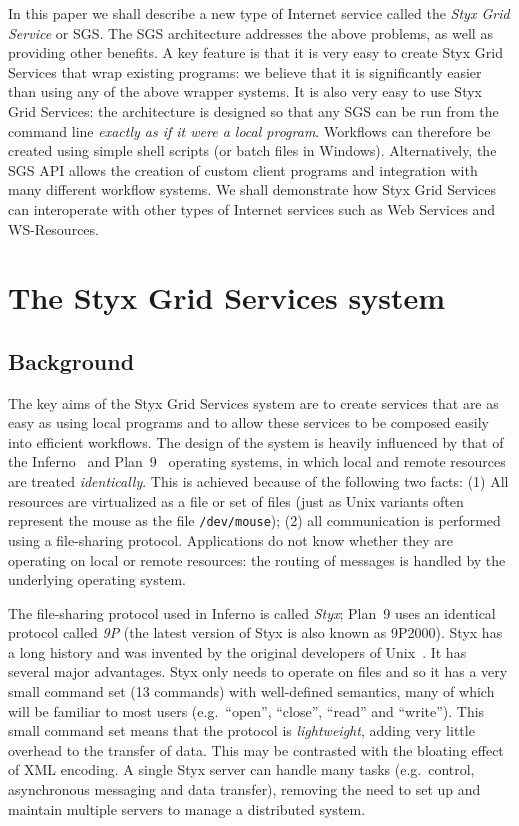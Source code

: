 \documentclass{llncs}
\begin{document}
In this paper we shall describe a new type of Internet service called the {\em Styx Grid Service\/} or SGS.  The SGS architecture addresses the above problems, as well as providing other benefits.  A key feature is that it is very easy to create Styx Grid Services that wrap existing programs: we believe that it is significantly easier than using any of the above wrapper systems.  It is also very easy to use Styx Grid Services: the architecture is designed so that any SGS can be run from the command line {\em exactly as if it were a local program\/}.  Workflows can therefore be created using simple shell scripts (or batch files in Windows).  Alternatively, the SGS API allows the creation of custom client programs and integration with many different workflow systems.  We shall demonstrate how Styx Grid Services can interoperate with other types of Internet services such as Web Services and WS-Resources.

%
\section{The Styx Grid Services system}
\subsection{Background}
The key aims of the Styx Grid Services system are to create services that are as easy as using local programs and to allow these services to be composed easily into efficient workflows.  The design of the system is heavily influenced by that of the Inferno~\cite{Inferno} and Plan~9~\cite{Plan9} operating systems, in which local and remote resources are treated {\em identically\/}.  This is achieved because of the following two facts: (1) All resources are virtualized as a file or set of files (just as Unix variants often represent the mouse as the file {\tt /dev/mouse}); (2) all communication is performed using a file-sharing protocol.  Applications do not know whether they are operating on local or remote resources: the routing of messages is handled by the underlying operating system.

The file-sharing protocol used in Inferno is called {\em Styx\/}; Plan~9 uses an identical protocol called {\em 9P\/} (the latest version of Styx is also known as 9P2000).  Styx has a long history and was invented by the original developers of Unix~\cite{Pike:1999}.  It has several major advantages.  Styx only needs to operate on files and so it has a very small command set (13 commands) with well-defined semantics, many of which will be familiar to most users (e.g.\ ``open'', ``close'', ``read'' and ``write'').  This small command set means that the protocol is {\em lightweight\/}, adding very little overhead to the transfer of data.  This may be contrasted with the bloating effect of XML encoding.  A single Styx server can handle many tasks (e.g.\ control, asynchronous messaging and data transfer), removing the need to set up and maintain multiple servers to manage a distributed system.
\end{document}
